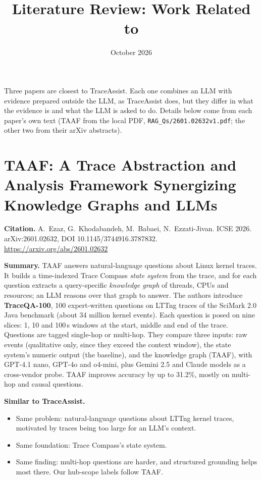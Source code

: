 \documentclass[11pt]{article}
\title{Literature Review: Work Related to \sysname}
\author{}
\date{October 2026}
\newcommand{\sysname}{TraceAssist\xspace}
\begin{document}
\maketitle

\noindent Three papers are closest to \sysname. Each one combines an LLM with
evidence prepared outside the LLM, as \sysname does, but they differ in what
the evidence is and what the LLM is asked to do. Details below come from each
paper's own text (TAAF from the local PDF, \texttt{RAG\_Qs/2601.02632v1.pdf};
the other two from their arXiv abstracts).

\section{TAAF: A Trace Abstraction and Analysis Framework Synergizing
Knowledge Graphs and LLMs}

\textbf{Citation.} A.~Ezaz, G.~Khodabandeh, M.~Babaei, N.~Ezzati-Jivan.
ICSE 2026. arXiv:2601.02632, DOI 10.1145/3744916.3787832.
\url{https://arxiv.org/abs/2601.02632}

\textbf{Summary.} TAAF answers natural-language questions about Linux kernel
traces. It builds a time-indexed Trace Compass \emph{state system} from the
trace, and for each question extracts a query-specific \emph{knowledge graph}
of threads, CPUs and resources; an LLM reasons over that graph to answer. The
authors introduce \textbf{TraceQA-100}, 100 expert-written questions on LTTng
traces of the SciMark 2.0 Java benchmark (about 34 million kernel events).
Each question is posed on nine slices: 1, 10 and 100\,s windows at the start,
middle and end of the trace. Questions are tagged single-hop or multi-hop.
They compare three inputs: raw events (qualitative only, since they exceed
the context window), the state system's numeric output (the baseline), and
the knowledge graph (TAAF), with GPT-4.1 nano, GPT-4o and o4-mini, plus
Gemini 2.5 and Claude models as a cross-vendor probe. TAAF improves accuracy
by up to 31.2\%, mostly on multi-hop and causal questions.

\textbf{Similar to \sysname.}
\begin{itemize}
  \item Same problem: natural-language questions about LTTng kernel traces,
        motivated by traces being too large for an LLM's context.
  \item Same foundation: Trace Compass's state system.
  \item Same finding: multi-hop questions are harder, and structured
        grounding helps most there. Our hub-scope labels follow TAAF.
\end{itemize}
\end{document}
